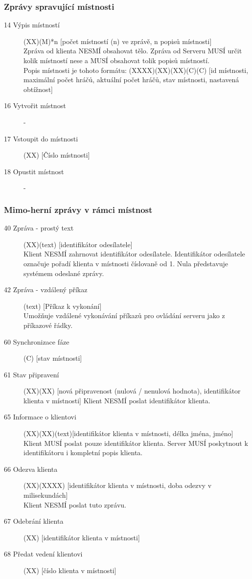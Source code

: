 \documentclass[12pt,a4paper]{article}
\begin{document}
\subsubsection*{Zprávy spravující místnosti}
\begin{description}
\item[14 Výpis místností] (XX)(M)*n [počet místností (n) ve zprávě, n popisů místnosti] \\
Zpráva od klienta NESMÍ obsahovat tělo. Zpráva od Serveru MUSÍ určit kolik místností nese a MUSÍ obsahovat tolik popisů místností. \\
Popis místnosti je tohoto formátu: (XXXX)(XX)(XX)(C)(C) [id místnosti, maximální počet hráčů, aktuální počet hráčů, stav místnosti, nastavená obtížnost]
\item[16 Vytvořit místnost] - \\
\item[17 Vstoupit do místnosti] (XX) [Číslo místnosti]
\item[18 Opustit místnost] -
\end{description}
\subsubsection*{Mimo-herní zprávy v rámci místnost}
\begin{description}
\item[40 Zpráva - prostý text](XX)(text) [identifikátor odesílatele] \\
Klient NESMÍ zahrnovat identifikátor odesílatele. Identifikátor odesílatele označuje pořadí klienta v místnosti číslovaně od 1. Nula představuje systémem odeslané zprávy.
\item[42 Zpráva - vzdálený příkaz](text) [Příkaz k vykonání] \\
Umožňuje vzdálené vykonávání příkazů pro ovládání serveru jako z příkazové řádky.

\item[60 Synchronizace fáze] (C) [stav místnosti]
\item[61 Stav připravení] (XX)(XX) [nová připravenost (nulová / nenulová hodnota), identifikátor klienta v místnosti]
Klient NESMÍ poslat identifikátor klienta.
\item[65 Informace o klientovi] (XX)(XX)(text)[identifikátor klienta v místnosti, délka jména, jméno] \\
Klient MUSÍ poslat pouze identifikátor klienta. Server MUSÍ poskytnout k identifikátoru i kompletní popis klienta.
\item[66 Odezva klienta] (XX)(XXXX) [identifikátor klienta v místnosti, doba odezvy v milisekundách] \\
Klient NESMÍ poslat tuto zprávu.
\item[67 Odebrání klienta] (XX) [identifikátor klienta v místnosti]
\item[68 Předat vedení klientovi] (XX) [číslo klienta v místnosti]
\end{description}
\end{document}
